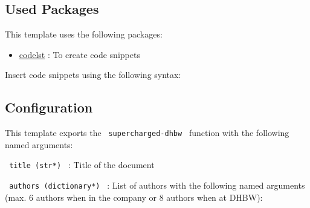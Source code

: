 \subsection{Used Packages}\label{used-packages}

This template uses the following packages:

\begin{itemize}
\tightlist
\item
  \href{https://typst.app/universe/package/codelst}{codelst} : To create
  code snippets
\end{itemize}

Insert code snippets using the following syntax:

\begin{Shaded}
\begin{Highlighting}[]
\NormalTok{\#figure(caption: "Codeblock Example", sourcecode[\textasciigrave{}\textasciigrave{}\textasciigrave{}ts}
\NormalTok{  );}
\NormalTok{\};}

\NormalTok{\textasciigrave{}\textasciigrave{}\textasciigrave{}])}
\end{Highlighting}
\end{Shaded}

\subsection{Configuration}\label{configuration}

This template exports the \texttt{\ supercharged-dhbw\ } function with
the following named arguments:

\texttt{\ title\ (str*)\ } : Title of the document

\texttt{\ authors\ (dictionary*)\ } : List of authors with the following
named arguments (max. 6 authors when in the company or 8 authors when at
DHBW):

